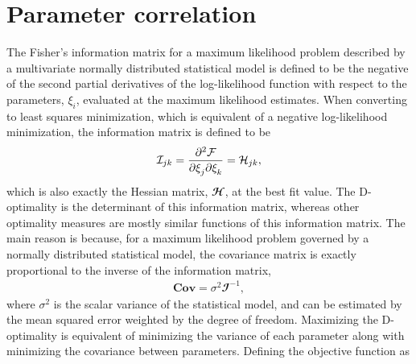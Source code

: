 \section{Parameter correlation}\label{sec:parametercorrelation}

	The Fisher's information matrix for a maximum likelihood problem described by a multivariate normally distributed statistical model is defined to be the negative of the second partial derivatives of the log-likelihood function with respect to the parameters, $\xi_i$, evaluated at the maximum likelihood estimates. When converting to least squares minimization, which is equivalent of a negative log-likelihood minimization, the information matrix is defined to be
\begin{equation}\label{eqn:informationmatrix}
\begin{aligned}
\mathcal{I}_{jk} = \dmd{\mathcal{F}}{2}{\xi_j}{}{\xi_k}{} = \mathcal{H}_{jk},
\end{aligned}
\end{equation}
which is also exactly the Hessian matrix, $\mathbfcal{H}$, at the best fit value. The D-optimality is the determinant of this information matrix, whereas other optimality measures are mostly similar functions of this information matrix. The main reason is because, for a maximum likelihood problem governed by a normally distributed statistical model, the covariance matrix is exactly proportional to the inverse of the information matrix,
\begin{equation}\label{eqn:covariancematrix}
\begin{aligned}
\mathbf{Cov} = \sigma^2 \mathbfcal{I}^{-1},
\end{aligned}
\end{equation}
where $\sigma^2$ is the scalar variance of the statistical model, and can be estimated by the mean squared error weighted by the degree of freedom. Maximizing the D-optimality is equivalent of minimizing the variance of each parameter along with minimizing the covariance between parameters. Defining the objective function as
